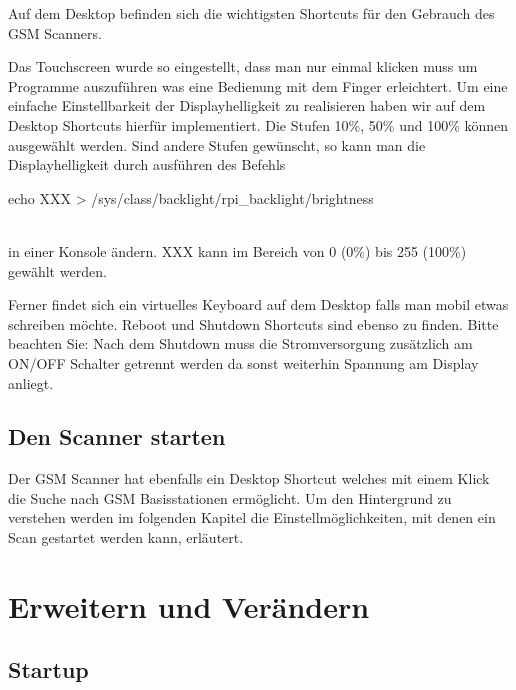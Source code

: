 Auf dem Desktop befinden sich die wichtigsten Shortcuts für den Gebrauch des \ac{GSM} Scanners. 



Das Touchscreen wurde so eingestellt, dass man nur einmal klicken muss um Programme auszuführen was eine Bedienung mit dem Finger erleichtert. Um eine einfache Einstellbarkeit der Displayhelligkeit zu realisieren haben wir auf dem Desktop Shortcuts hierfür implementiert. Die Stufen 10\%, 50\% und 100\% können ausgewählt werden. Sind andere Stufen gewünscht, so kann man die Displayhelligkeit durch ausführen des Befehls
\begin{code}
echo XXX > /sys/class/backlight/rpi_backlight/brightness
\end{code}
\noindent\\ in einer Konsole ändern. XXX kann im Bereich von 0 (0\%) bis 255 (100\%) gewählt werden. 

Ferner findet sich ein virtuelles Keyboard auf dem Desktop falls man mobil etwas schreiben möchte. Reboot und Shutdown Shortcuts sind ebenso zu finden. Bitte beachten Sie: Nach dem Shutdown muss die Stromversorgung zusätzlich am ON/OFF Schalter getrennt werden da sonst weiterhin Spannung am Display anliegt.

\subsection{Den Scanner starten}

Der \ac{GSM} Scanner hat ebenfalls ein Desktop Shortcut welches mit einem Klick die Suche nach \ac{GSM} Basisstationen ermöglicht. Um den Hintergrund zu verstehen werden im folgenden Kapitel die Einstellmöglichkeiten, mit denen ein Scan gestartet werden kann, erläutert. 

\section{Erweitern und Verändern}
\subsection{Startup}

